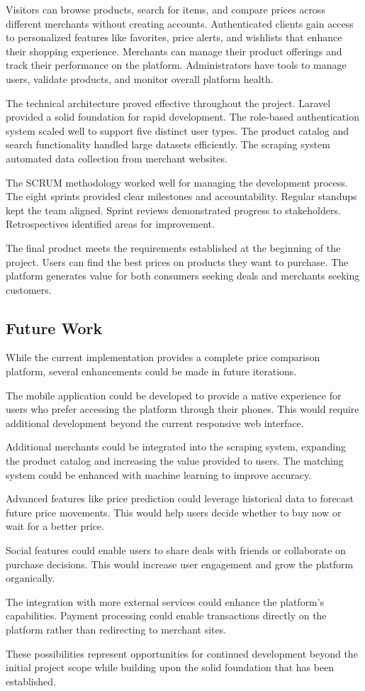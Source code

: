 Visitors can browse products, search for items, and compare
prices across different merchants without creating accounts.
Authenticated clients gain access to personalized features
like favorites, price alerts, and wishlists that enhance their
shopping experience. Merchants can manage their product
offerings and track their performance on the platform.
Administrators have tools to manage users, validate products,
and monitor overall platform health.

The technical architecture proved effective throughout the
project. Laravel provided a solid foundation for rapid
development. The role-based authentication system scaled well
to support five distinct user types. The product catalog and
search functionality handled large datasets efficiently. The
scraping system automated data collection from merchant websites.

The SCRUM methodology worked well for managing the development
process. The eight sprints provided clear milestones and
accountability. Regular standups kept the team aligned. Sprint
reviews demonstrated progress to stakeholders. Retrospectives
identified areas for improvement.

The final product meets the requirements established at the
beginning of the project. Users can find the best prices on
products they want to purchase. The platform generates value
for both consumers seeking deals and merchants seeking customers.

\subsection*{Future Work}

While the current implementation provides a complete price
comparison platform, several enhancements could be made in
future iterations.

The mobile application could be developed to provide a native
experience for users who prefer accessing the platform through
their phones. This would require additional development beyond
the current responsive web interface.

Additional merchants could be integrated into the scraping
system, expanding the product catalog and increasing the
value provided to users. The matching system could be enhanced
with machine learning to improve accuracy.

Advanced features like price prediction could leverage
historical data to forecast future price movements. This
would help users decide whether to buy now or wait for a
better price.

Social features could enable users to share deals with friends
or collaborate on purchase decisions. This would increase
user engagement and grow the platform organically.

The integration with more external services could enhance
the platform's capabilities. Payment processing could enable
transactions directly on the platform rather than redirecting
to merchant sites.

These possibilities represent opportunities for continued
development beyond the initial project scope while building
upon the solid foundation that has been established.